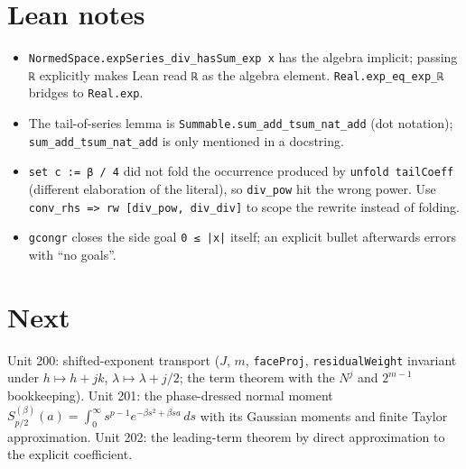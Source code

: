 \documentclass[11pt]{article}
\begin{document}
\section{Lean notes}
\begin{itemize}
\item \texttt{NormedSpace.expSeries\_div\_hasSum\_exp x} has the algebra implicit; passing
  \texttt{ℝ} explicitly makes Lean read \texttt{ℝ} as the algebra element.
  \texttt{Real.exp\_eq\_exp\_ℝ} bridges to \texttt{Real.exp}.
\item The tail-of-series lemma is \texttt{Summable.sum\_add\_tsum\_nat\_add} (dot notation);
  \texttt{sum\_add\_tsum\_nat\_add} is only mentioned in a docstring.
\item \texttt{set c := β / 4} did not fold the occurrence produced by \texttt{unfold tailCoeff}
  (different elaboration of the literal), so \texttt{div\_pow} hit the wrong power. Use
  \texttt{conv\_rhs => rw [div\_pow, div\_div]} to scope the rewrite instead of folding.
\item \texttt{gcongr} closes the side goal \texttt{0 ≤ |x|} itself; an explicit bullet afterwards
  errors with ``no goals''.
\end{itemize}

\section{Next}
Unit 200: shifted-exponent transport ($J$, $m$, \texttt{faceProj}, \texttt{residualWeight}
invariant under $h\mapsto h+jk$, $\lambda\mapsto\lambda+j/2$; the term theorem with the $N^j$ and
$2^{m-1}$ bookkeeping). Unit 201: the phase-dressed normal moment
$S^{(\beta)}_{p/2}(a)=\int_0^\infty s^{p-1}e^{-\beta s^2+\beta sa}\,ds$ with its Gaussian moments and
finite Taylor approximation. Unit 202: the leading-term theorem by direct approximation to the
explicit coefficient.
\end{document}
